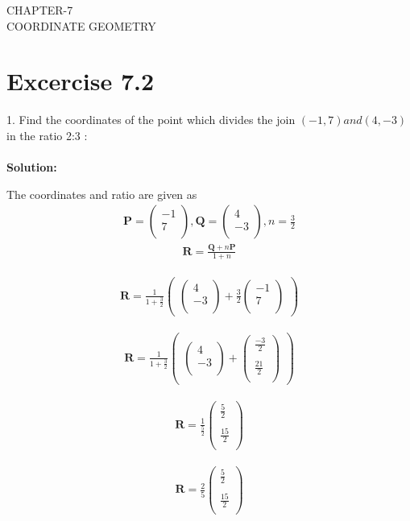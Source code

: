 \documentclass[12pt]{article}
\providecommand{\brak}[1]{\ensuremath{\left(#1\right)}}
\newcommand{\solution}{\noindent \textbf{Solution: }}
\newcommand{\myvec}[1]{\ensuremath{\begin{pmatrix}#1\end{pmatrix}}}
\let\vec\mathbf
\begin{document}
\begin{center}
\textbf\large{CHAPTER-7 \\ COORDINATE GEOMETRY}
\end{center}
\section*{Excercise 7.2}

1. Find the coordinates of the point which divides the join $\brak{-1,7} and \brak{4,-3}$ in the ratio 2:3 :
\\
\\
\solution

 The coordinates and ratio are given as
\begin{align}
\vec{P} = \myvec{
-1\\
7\\
},
\vec{Q} = \myvec{
4\\
-3\\
},  n=\frac{3}{2}
\end{align}
\begin{align}
\vec{R} =\frac{\vec{Q}+n\vec{P}}{1+n}
\end{align}


\begin{align}
	\vec{R}=   \frac{1}{1+\frac{3}{2}}  \myvec{\myvec{
4\\
-3\\
}
  +
   \frac{3}{2}\myvec{
-1\\
7\\
}}
\end{align}

\begin{align}
\vec{R}= \frac{1}{1+\frac{3}{2}} \myvec{\myvec{
4\\
-3\\
}
  +
  \myvec{
	  \frac{-3}{2}\\
	  \\
	\frac{21}{2}\\
}} 
\end{align}

\begin{align}
	\vec{R}=\frac{1}{\frac{5}{2}} 
	\myvec{
	\frac{5}{2}\\
	\\
	\frac{15}{2}\\
}
\end{align}

\begin{align}
          \vec{R}=\frac{2}{5}
        \myvec{
          \frac{5}{2}\\
	  \\
	\frac{15}{2}\\
  }
  \end{align}
\end{document}
